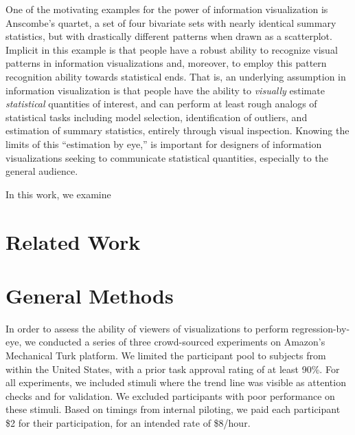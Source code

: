 \documentclass{sigchi}
\begin{document}
One of the motivating examples for the power of information visualization is Anscombe's quartet\cite{anscombe1973graphs}, a set of four bivariate sets with nearly identical summary statistics, but with drastically different patterns when drawn as a scatterplot. Implicit in this example is that people have a robust ability to recognize visual patterns in information visualizations and, moreover, to employ this pattern recognition ability towards statistical ends. That is, an underlying assumption in information visualization is that people have the ability to \emph{visually} estimate \emph{statistical} quantities of interest, and can perform at least rough analogs of statistical tasks including model selection, identification of outliers, and estimation of summary statistics, entirely through visual inspection. Knowing the limits of this ``estimation by eye,'' is important for designers of information visualizations seeking to communicate statistical quantities, especially to the general audience.

In this work, we examine 

\section{Related Work}

\section{General Methods}

In order to assess the ability of viewers of visualizations to perform regression-by-eye, we conducted a series of three crowd-sourced experiments on Amazon's Mechanical Turk platform. We limited the participant pool to subjects from within the United States, with a prior task approval rating of at least 90\%. For all experiments, we included stimuli where the trend line was visible as attention checks and for validation. We excluded participants with poor performance on these stimuli. Based on timings from internal piloting, we paid each participant \$2 for their participation, for an intended rate of \$8/hour. 
\end{document}
